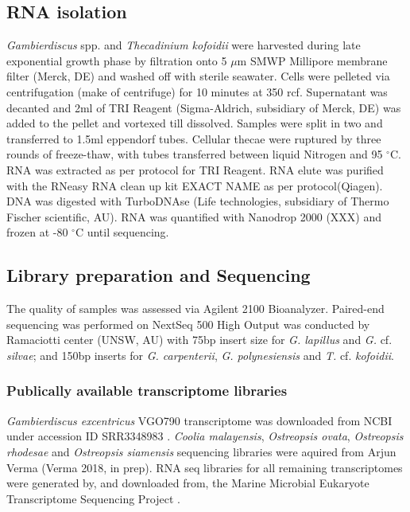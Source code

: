 \documentclass[12pt]{article}
\begin{document}
 \subsection*{RNA isolation}
\emph{Gambierdiscus} spp. and \emph{Thecadinium kofoidii} were harvested during late exponential growth phase by filtration onto 5 $\mu$m SMWP Millipore membrane filter (Merck, DE) and washed off with sterile seawater. 
Cells were pelleted via centrifugation (make of centrifuge) for 10 minutes at 350 rcf. 
Supernatant was decanted and 2ml of TRI Reagent (Sigma-Aldrich, subsidiary of Merck, DE) was added to the pellet and vortexed till dissolved. 
Samples were split in two and transferred to 1.5ml eppendorf tubes. 
Cellular thecae were ruptured by three rounds of freeze-thaw, with tubes transferred between liquid Nitrogen and 95 $^{\circ}$C. 
RNA was extracted as per protocol for TRI Reagent. 
RNA elute was purified with the RNeasy RNA clean up kit EXACT NAME as per protocol(Qiagen). 
DNA was digested with TurboDNAse (Life technologies, subsidiary of Thermo Fischer scientific, AU). 
RNA was quantified with Nanodrop 2000 (XXX) and frozen at -80 $^{\circ}$C until sequencing.
 
\subsection*{Library preparation and Sequencing}
The quality of samples was assessed via Agilent 2100 Bioanalyzer. 
Paired-end sequencing was performed on NextSeq 500 High Output was conducted by Ramaciotti center (UNSW, AU) with 75bp insert size for \emph{G. lapillus} and \emph{G.} cf. \emph{silvae}; and 150bp inserts for \emph{G. carpenterii}, \emph{G. polynesiensis} and \emph{T.} cf. \emph{kofoidii}.
\subsubsection*{Publically available transcriptome libraries}
\emph{Gambierdiscus excentricus} VGO790 transcriptome was downloaded from NCBI under accession ID SRR3348983 \cite{kohli2017role}. 
\textit{Coolia malayensis}, \textit{Ostreopsis ovata}, \textit{Ostreopsis rhodesae} and \textit{Ostreopsis siamensis} sequencing libraries were aquired from Arjun Verma (Verma 2018, in prep). 
RNA seq libraries for all remaining transcriptomes were generated by, and downloaded from, the Marine Microbial Eukaryote Transcriptome Sequencing Project \citep{keeling2014marine}.
\end{document}
